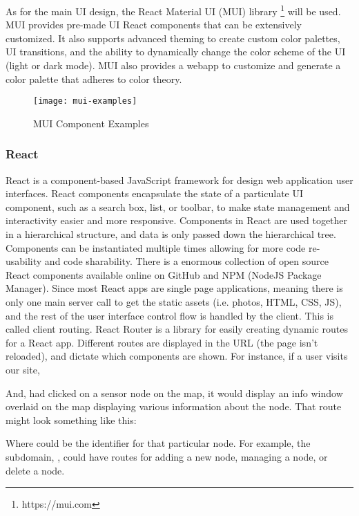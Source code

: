 As for the main UI design, the React Material UI (MUI) library \footnote{https://mui.com} will be
used. MUI provides pre-made UI React components that can be extensively customized. It also supports
advanced theming to create custom color palettes, UI transitions, and the ability to dynamically
change the color scheme of the UI (light or dark mode). MUI also provides a webapp to customize and
generate a color palette that adheres to color theory.

\begin{figure}
  \centering
  \texttt{[image: mui-examples]}
  \caption[MUI Component Examples]{MUI Component Examples \protect\footnotemark}
  \label{fig:mui-example-components} 
\end{figure}

\subsubsection{React}
React is a component-based JavaScript framework for design web application user interfaces. React
components encapsulate the state of a particulate UI component, such as a search box, list, or
toolbar, to make state management and interactivity easier and more responsive. Components in React
are used together in a hierarchical structure, and data is only passed down the hierarchical tree.
Components can be instantiated multiple times allowing for more code re-usability and code
sharability. There is a enormous collection of open source React components available online on
GitHub and NPM (NodeJS Package Manager). Since most React apps are single page applications, meaning
there is only one main server call to get the static assets (i.e. photos, HTML, CSS, JS), and the
rest of the user interface control flow is handled by the client. This is called client routing.
React Router is a library for easily creating dynamic routes for a React app. Different routes are
displayed in the URL (the page isn't reloaded), and dictate which components are shown. For
instance, if a user visits our site,


And, had clicked on a sensor node on the map, it would display an info window
overlaid on the map displaying various information about the node. That route might look something
like this:


Where  could be the identifier for that particular node. For example, the subdomain,
, could have routes for adding a new node, managing a node, or delete a node.

